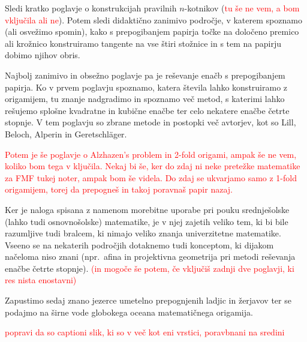 Sledi kratko poglavje o konstrukcijah pravilnih $n$-kotnikov (\textcolor{red}{tu še ne vem, a bom vključila ali ne}). Potem sledi didaktično zanimivo področje, v katerem spoznamo (ali osvežimo spomin), kako s prepogibanjem papirja točke na določeno premico ali krožnico konstruiramo tangente na vse štiri stožnice in s tem na papirju dobimo njihov obris.

Najbolj zanimivo in obsežno poglavje pa je reševanje enačb s prepogibanjem papirja. Ko v prvem poglavju spoznamo, katera števila lahko konstruiramo z origamijem, tu znanje nadgradimo in spoznamo več metod, s katerimi lahko rešujemo splošne kvadratne in kubične enačbe ter celo nekatere enačbe četrte stopnje. V tem poglavju so zbrane metode in postopki več avtorjev, kot so Lill, Beloch, Alperin in Geretschläger.

\textcolor{red}{Potem je še poglavje o Alzhazen's problem in 2-fold origami, ampak še ne vem, koliko bom tega v ključila. Nekaj bi še, ker do zdaj ni neke pretežke matematike za FMF tukej noter, ampak bom še videla. Do zdaj se ukvarjamo samo z 1-fold origamijem, torej da prepogneš in takoj poravnaš papir nazaj.}

Ker je naloga spisana z namenom morebitne uporabe pri pouku srednješolske (lahko tudi osnovnošolske) matematike, je v njej zajetih veliko tem, ki bi bile razumljive tudi bralcem, ki nimajo veliko znanja univerzitetne matematike. Vseeno se na nekaterih področjih dotaknemo tudi konceptom, ki dijakom načeloma niso znani (npr.\ afina in projektivna geometrija pri metodi reševanja enačbe četrte stopnje). \textcolor{red}{(in mogoče še potem, če vključiš zadnji dve poglavji, ki res nista enostavni)}

Zapustimo sedaj znano jezerce umetelno prepognjenih ladjic in žerjavov ter se podajmo na širne vode globokega oceana matematičnega origamija.

\textcolor{red}{popravi da so captioni slik, ki so v več kot eni vrstici, poravbnani na sredini}